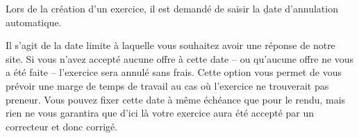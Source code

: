 Lors de la création d'un exercice, il est demandé de saisir la \b{date d'annulation automatique}.

Il s'agit de la date limite à laquelle vous souhaitez avoir une réponse de notre site.
Si vous n'avez accepté aucune offre à cette date -- ou qu'aucune offre ne vous a été faite -- l'exercice sera annulé sans frais. Cette option vous permet de vous prévoir une marge de temps de travail au cas où l'exercice ne trouverait pas preneur. Vous pouvez fixer cette date à même échéance que pour le rendu, mais rien ne vous garantira que d'ici là votre exercice aura été accepté par un correcteur et donc corrigé.